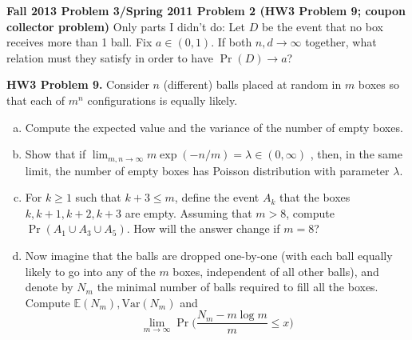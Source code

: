 \documentclass{article}
\newcommand{\E}{\mathbb{E}}
\newcommand{\Var}{\mathrm{Var}}
\begin{document}
\textbf{Fall 2013 Problem 3/Spring 2011 Problem 2 (HW3 Problem 9; coupon collector problem)} Only parts I didn't do:  Let \(D\) be the event that no box receives more than 1 ball. Fix \(a \in (0,1)\). If both \(n, d \to \infty\) together, what relation must they satisfy in order to have \(\Pr(D) \to a\)?

\textbf{HW3 Problem 9.} Consider \(n\) (different) balls placed at random in \(m\) boxes so that each of \(m^n\) configurations is equally likely.

\begin{enumerate}[(a)]

\item Compute the expected value and the variance of the number of empty boxes.

\item Show that if \(\lim_{m, n \to \infty} m \exp(-n/m) = \lambda \in (0, \infty)\) , then, in the same limit, the number of empty boxes has Poisson distribution with parameter \(\lambda\). 
\item For \(k \geq 1\) such that \(k + 3 \leq m\), define the event \(A_k\) that the boxes \(k, k+1, k+2, k+3\) are empty. Assuming that \(m > 8\), compute \(\Pr(A_1 \cup A_3 \cup A_5)\). How will the answer change if \(m = 8\)?

\item Now imagine that the balls are dropped one-by-one (with each ball equally likely to go into any of the \(m\) boxes, independent of all other balls), and denote by \(N_m\) the minimal number of balls required to fill all the boxes. Compute \(\E(N_m), \Var(N_m)\) and \[ \lim_{m \to \infty} \Pr \bigg( \frac{N_m - m \log m}{m} \leq x \bigg) \]

\end{enumerate}
\end{document}
